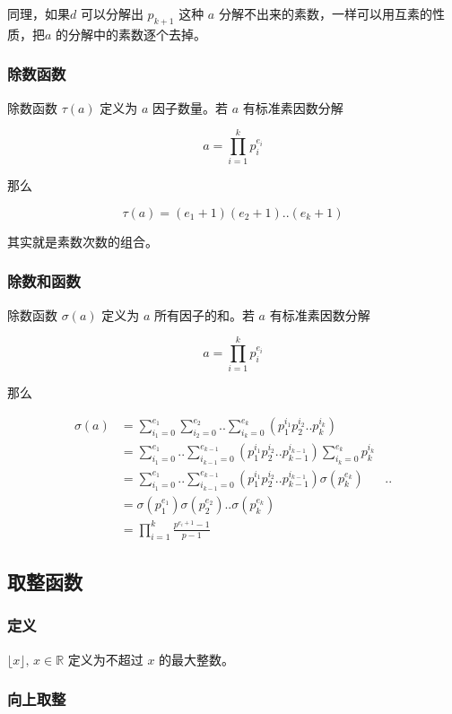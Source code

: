\documentclass[12pt,a4paper]{ctexart}
\begin{document}
同理，如果$d$ 可以分解出 $p_{k+1}$ 这种 $a$ 分解不出来的素数，一样可以用互素的性质，把$a$ 的分解中的素数逐个去掉。

\subsubsection{除数函数}

除数函数 $\tau(a)$ 定义为 $a$ 因子数量。若 $a$ 有标准素因数分解 

\[
a = \prod_{i=1}^{k}p_i^{e_i}
\]

那么 

\[
\tau(a) = (e_1 + 1)(e_2 + 1) .. (e_k + 1)
\]

其实就是素数次数的组合。

\subsubsection{除数和函数}

除数函数 $\sigma(a)$ 定义为 $a$ 所有因子的和。若 $a$ 有标准素因数分解 


\[
a = \prod_{i=1}^{k}p_i^{e_i}
\]

那么

\begin{align*}
    \sigma(a) &= \sum_{i_1=0}^{e_1} \sum_{i_2=0}^{e_2} .. \sum_{i_k=0}^{e_k} (p_1^{i_1}p_2^{i_2}..p_k^{i_k}) \\
    &= \sum_{i_1=0}^{e_1} ..\sum_{i_{k-1}=0}^{e_{k-1}} (p_1^{i_1}p_2^{i_2}..p_{k-1}^{i_{k-1}})\sum_{i_k=0}^{e_k} p_k^{i_k} \\
    &= \sum_{i_1=0}^{e_1} ..\sum_{i_{k-1}=0}^{e_{k-1}} (p_1^{i_1}p_2^{i_2}..p_{k-1}^{i_{k-1}})\sigma(p_k^{e_k})
    & .. \\
    &= \sigma(p_1^{e_1})\sigma(p_2^{e_2}).. \sigma(p_k^{e_k}) \\
    &= \prod_{i=1}^{k}\frac{p^{e_i+1}-1}{p-1}
\end{align*}

\subsection{取整函数}

\subsubsection{定义}

$\lfloor x \rfloor,\, x \in \mathbb{R}$ 定义为不超过 $x$ 的最大整数。

\subsubsection{向上取整}
\end{document}

